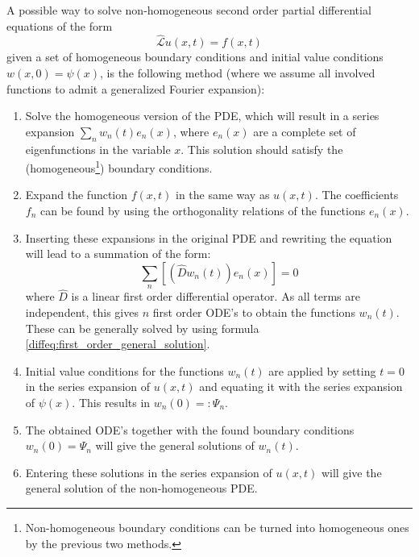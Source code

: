     \begin{method}
        A possible way to solve non-homogeneous second order partial differential equations of the form \[\hat{\mathcal{L}}u(x, t) = f(x, t)\] given a set of homogeneous boundary conditions and initial value conditions $w(x, 0) = \psi(x)$, is the following method (where we assume all involved functions to admit a generalized Fourier expansion):
        \begin{enumerate}
            \item Solve the homogeneous version of the PDE, which will result in a series expansion $\sum_nw_n(t)e_n(x)$, where $e_n(x)$ are a complete set of eigenfunctions in the variable $x$. This solution should satisfy the (homogeneous\footnote{Non-homogeneous boundary conditions can be turned into homogeneous ones by the previous two methods.}) boundary conditions.
            \item Expand the function $f(x, t)$ in the same way as $u(x, t)$. The coefficients $f_n$ can be found by using the orthogonality relations of the functions $e_n(x)$.
            \item Inserting these expansions in the original PDE and rewriting the equation will lead to a summation of the form:
            \[\sum_n\left[\left(\hat{D}w_n(t)\right)e_n(x)\right] = 0\] where $\hat{D}$ is a linear first order differential operator. As all terms are independent, this gives $n$ first order ODE's to obtain the functions $w_n(t)$. These can be generally solved by using formula \ref{diffeq:first_order_general_solution}.
            \item Initial value conditions for the functions $w_n(t)$ are applied by setting $t=0$ in the series expansion of $u(x, t)$ and equating it with the series expansion of $\psi(x)$. This results in $w_n(0) =: \Psi_n$.
            \item The obtained ODE's together with the found boundary conditions $w_n(0) = \Psi_n$ will give the general solutions of $w_n(t)$.
            \item Entering these solutions in the series expansion of $u(x, t)$ will give the general solution of the non-homogeneous PDE.
        \end{enumerate}
    \end{method}

